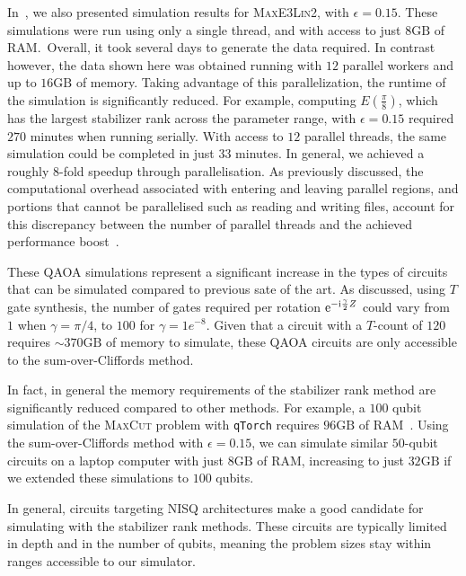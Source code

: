 In~\cite{Bravyi2018}, we also presented simulation results for \textsc{MaxE3Lin2}, with $\epsilon=0.15$. These simulations were run using only a single thread, and with access to just $8\mathrm{GB}$ of RAM.\ Overall, it took several days to generate the data required. In contrast however, the data shown here was obtained running with $12$ parallel workers and up to $16\mathrm{GB}$ of memory. Taking advantage of this parallelization, the runtime of the simulation is significantly reduced. For example, computing $E(\frac{\pi}{8})$, which has the largest stabilizer rank across the parameter range, with $\epsilon=0.15$ required $270$ minutes when running serially. With access to $12$ parallel threads, the same simulation could be completed in just $33$ minutes. In general, we achieved a roughly $8$-fold speedup through parallelisation. As previously discussed, the computational overhead associated with entering and leaving parallel regions, and portions that cannot be parallelised such as reading and writing files, account for this discrepancy between the number of parallel threads and the achieved performance boost~\cite{Amdahl1967}.\par
These QAOA simulations represent a significant increase in the types of circuits that can be simulated compared to previous sate of the art. As discussed, using $T$ gate synthesis, the number of gates required per rotation $\mathrm{e}^{-\mathrm{i}\frac{\gamma}{2}Z}$ could vary from $1$ when $\gamma=\pi/4$, to $100$ for $\gamma=1e^{-8}$. Given that a circuit with a $T$-count of $120$ requires $\sim 370\mathrm{GB}$ of memory to simulate, these QAOA circuits are only accessible to the sum-over-Cliffords method.\par
In fact, in general the memory requirements of the stabilizer rank method are significantly reduced compared to other methods. For example, a $100$ qubit simulation of the \textsc{MaxCut} problem with \texttt{qTorch} requires $96\mathrm{GB}$ of RAM~\cite{SchuylerFried2017}. Using the sum-over-Cliffords method with $\epsilon=0.15$, we can simulate similar $50$-qubit circuits on a laptop computer with just $8\mathrm{GB}$ of RAM, increasing to just $32\mathrm{GB}$ if we extended these simulations to $100$ qubits.\par
In general, circuits targeting NISQ architectures make a good candidate for simulating with the stabilizer rank methods. These circuits are typically limited in depth and in the number of qubits, meaning the problem sizes stay within ranges accessible to our simulator.\par
